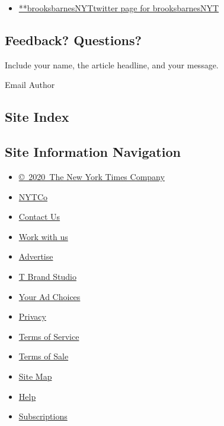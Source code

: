 \begin{itemize}
\tightlist
\item
  \href{https://twitter.com/brooksbarnesNYT}{**brooksbarnesNYTtwitter
  page for brooksbarnesNYT}
\end{itemize}

\hypertarget{feedback-questions}{%
\subsection{Feedback? Questions?}\label{feedback-questions}}

Include your name, the article headline, and your message.

Email Author

\hypertarget{site-index}{%
\subsection{Site Index}\label{site-index}}

\hypertarget{site-information-navigation}{%
\subsection{Site Information
Navigation}\label{site-information-navigation}}

\begin{itemize}
\tightlist
\item
  \href{https://help.nytimes.com/hc/en-us/articles/115014792127-Copyright-notice}{©~2020~The
  New York Times Company}
\end{itemize}

\begin{itemize}
\tightlist
\item
  \href{https://www.nytco.com/}{NYTCo}
\item
  \href{https://help.nytimes.com/hc/en-us/articles/115015385887-Contact-Us}{Contact
  Us}
\item
  \href{https://www.nytco.com/careers/}{Work with us}
\item
  \href{https://nytmediakit.com/}{Advertise}
\item
  \href{http://www.tbrandstudio.com/}{T Brand Studio}
\item
  \href{https://www.nytimes.com/privacy/cookie-policy\#how-do-i-manage-trackers}{Your
  Ad Choices}
\item
  \href{https://www.nytimes.com/privacy}{Privacy}
\item
  \href{https://help.nytimes.com/hc/en-us/articles/115014893428-Terms-of-service}{Terms
  of Service}
\item
  \href{https://help.nytimes.com/hc/en-us/articles/115014893968-Terms-of-sale}{Terms
  of Sale}
\item
  \href{https://spiderbites.nytimes.com}{Site Map}
\item
  \href{https://help.nytimes.com/hc/en-us}{Help}
\item
  \href{https://www.nytimes.com/subscription?campaignId=37WXW}{Subscriptions}
\end{itemize}
